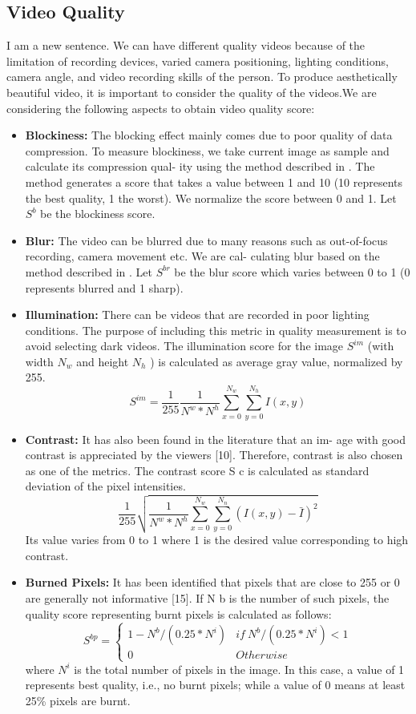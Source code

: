 \documentclass{sig-alternate}
\begin{document}
\subsection{Video Quality}
I am a new sentence.
We can have different quality videos because of the limitation of
recording devices, varied camera positioning, lighting conditions,
camera angle, and video recording skills of the person. To produce
aesthetically beautiful video, it is important to consider the quality
of the videos.We are considering the following aspects to obtain
video quality score:
\begin{itemize}
\item \textbf{Blockiness:} The blocking effect mainly comes due to poor
quality of data compression. To measure blockiness, we take
current image as sample and calculate its compression qual-
ity using the method described in \cite{salas:eighteen}. The method generates
a score that takes a value between 1 and 10 (10 represents the
best quality, 1 the worst). We normalize the score between 0
and 1. Let $S^b$ be the blockiness score.
\item \textbf{Blur:} The video can be blurred due to many reasons such as
out-of-focus recording, camera movement etc. We are cal-
culating blur based on the method described in \cite{salas:five}. Let $S^{br}$
be the blur score which varies between 0 to 1 (0 represents
blurred and 1 sharp).
\item \textbf{Illumination:} There can be videos that are recorded in poor
lighting conditions. The purpose of including this metric in
quality measurement is to avoid selecting dark videos. The
illumination score for the image $S^{im}$ (with width $N_w$ and
height $N_h$ ) is calculated as average gray value, normalized
by 255.
\[S^{im}=\frac{1}{255}\frac{1}{N^w*N^h}\sum_{x=0}^{N_w}\sum_{y=0}^{N_h}I(x,y)\tag{9}\]
\item \textbf{Contrast:} It has also been found in the literature that an im-
age with good contrast is appreciated by the viewers [10].
Therefore, contrast is also chosen as one of the metrics. The
contrast score S c is calculated as standard deviation of the
pixel intensities.
\[\frac{1}{255}\sqrt{\frac{1}{N^w*N^h}\sum_{x=0}^{N_w}\sum_{y=0}^{N_n}(I(x,y)-\bar{I})^2}\tag{10}\]
Its value varies from 0 to 1 where 1 is the desired value corresponding to high contrast.
\item \textbf{Burned Pixels:} It has been identified that pixels that are
close to 255 or 0 are generally not informative [15]. If N b
is the number of such pixels, the quality score representing
burnt pixels is calculated as follows:
\[S^{bp}=\left\{\begin{matrix} 1-N^b/(0.25*N^i) & if\ N^b/(0.25*N^i)<1 \\ 0 & Otherwise \end{matrix}\right.\tag{11}\]
where $N^i$ is the total number of pixels in the image. In this
case, a value of 1 represents best quality, i.e., no burnt pixels;
while a value of 0 means at least 25\% pixels are burnt.


\end{itemize}
\end{document}
